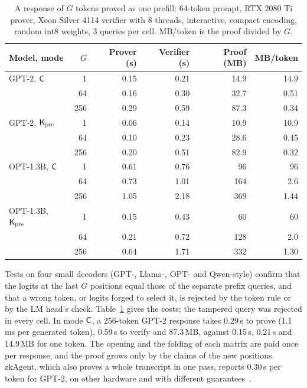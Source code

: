 \begin{table}[t]
  \caption{A response of $G$ tokens proved as one prefill: 64-token prompt, RTX 2080 Ti prover,
  Xeon Silver 4114 verifier with 8 threads, interactive, compact encoding, random int8 weights,
  3 queries per cell. MB/token is the proof divided by $G$.}
  \label{tab:gen}
  \centering\footnotesize
  \setlength{\tabcolsep}{3.5pt}
  \begin{tabular}{@{}lrrrrr@{}}
    \toprule
    Model, mode & $G$ & Prover (s) & Verifier (s) & Proof (MB) & MB/token \\
    \midrule
    GPT-2, $\mathsf{C}$       & 1   & 0.15 & 0.21 & 14.9 & 14.9 \\
                       & 64  & 0.16 & 0.30 & 32.7 & 0.51 \\
                       & 256 & 0.29 & 0.59 & 87.3 & 0.34 \\
    GPT-2, $\mathsf{K}_{\mathrm{pre}}$     & 1   & 0.06 & 0.14 & 10.9 & 10.9 \\
                       & 64  & 0.10 & 0.23 & 28.6 & 0.45 \\
                       & 256 & 0.20 & 0.51 & 82.9 & 0.32 \\
    \midrule
    OPT-1.3B, $\mathsf{C}$    & 1   & 0.61 & 0.76 & 96   & 96   \\
                       & 64  & 0.73 & 1.01 & 164  & 2.6  \\
                       & 256 & 1.05 & 2.18 & 369  & 1.44 \\
    OPT-1.3B, $\mathsf{K}_{\mathrm{pre}}$  & 1   & 0.15 & 0.43 & 60   & 60   \\
                       & 64  & 0.21 & 0.72 & 128  & 2.0  \\
                       & 256 & 0.64 & 1.71 & 332  & 1.30 \\
    \bottomrule
  \end{tabular}
\end{table}

 Tests on four small decoders (GPT-, Llama-, OPT- and Qwen-style) confirm
that the logits at the last $G$ positions equal those of the separate prefix queries, and that a
wrong token, or logits forged to select it, is rejected by the token rule or by the LM head's
check. Table~\ref{tab:gen} gives the costs; the tampered query was rejected in every cell. In
mode $\mathsf{C}$, a 256-token GPT-2 response takes 0.29\,s to prove (1.1\,ms per generated token),
0.59\,s to verify and 87.3\,MB, against 0.15\,s, 0.21\,s and 14.9\,MB for one token. The opening
and the folding of each matrix are paid once per response, and the proof grows only by the claims
of the new positions. zkAgent, which also proves a whole
transcript in one pass, reports 0.30\,s per token for GPT-2, on other hardware and with different
guarantees~\cite{zkagent}. 

